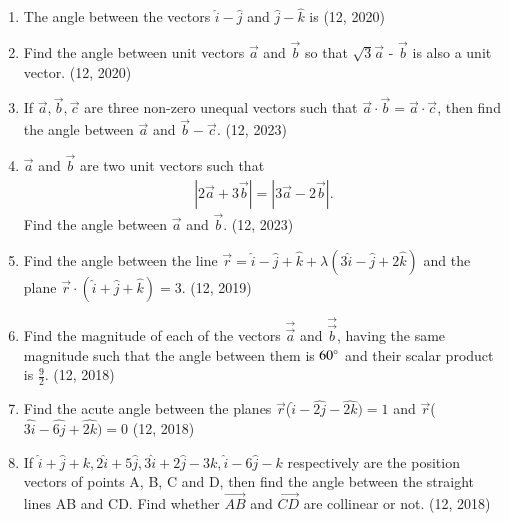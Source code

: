 \begin{enumerate}[label=\thesubsection.\arabic*, ref=\thesubsection.\theenumi]
\item The angle between the vectors $\hat{i} - \hat{j}$ and $\hat{j} - \hat{k}$ is
\hfill (12, 2020)
\item Find the angle between unit vectors $\overrightarrow{a}$ and $\overrightarrow{b}$ so that $\sqrt{3}\overrightarrow{a}$ - $\overrightarrow{b}$ is also a unit vector.
\hfill (12, 2020)
    \item If $\overrightarrow{a}, \overrightarrow{b}, \overrightarrow{c}$ are three non-zero unequal vectors such that $\overrightarrow{a} \cdot \overrightarrow{b} = \overrightarrow{a} \cdot \overrightarrow{c}$, then find the angle between $\overrightarrow{a}$ and $\overrightarrow{b} - \overrightarrow{c}$.
    \hfill (12, 2023)
    \item $\overrightarrow{a}$ and $\overrightarrow{b}$ are two unit vectors such that
    \begin{align}
        \left| 2\overrightarrow{a} + 3\overrightarrow{b} \right| = \left| 3\overrightarrow{a} - 2\overrightarrow{b} \right|.
    \end{align}
  Find the angle between $\overrightarrow{a}$ and $\overrightarrow{b}$.
    \hfill (12, 2023)
	\item Find the angle between the line $\overrightarrow{r} = \hat{i} - \hat{j} + \hat{k} + \lambda (3\hat{i} - \hat{j} + 2\hat{k})$ and the plane $\overrightarrow{r} \cdot (\hat{i} + \hat{j} + \hat{k}) = 3$. \hfill (12, 2019)
\item Find the magnitude of each of the vectors $\overrightarrow{\vec{a}}$ and $\overrightarrow{\vec{b}}$, having the same magnitude such that the angle between them is $60\degree$ and their scalar product is $\frac{9}{2}$. \hfill (12, 2018)
\item Find the acute angle between the planes $\vec{r}$($ \hat{i}-\hat{2j}-\hat{2k})=1$ and $\vec{r}$($ \hat{3i}-\hat{6j}+\hat{2k})=0$
\hfill (12, 2018)
\item If $\hat{i}+\hat{j}+{k} ,  2\hat{i}+5\hat{j} ,  3\hat{i}+2\hat{j}-3{k} ,  \hat{i}-6\hat{j}-{k}$ respectively are the position vectors of points A, B, C and D, then find the angle between the straight lines AB and CD. Find whether $\overrightarrow{AB}$ and $\overrightarrow{CD}$ are collinear or not. 
\hfill (12, 2018) 

\end{enumerate}
